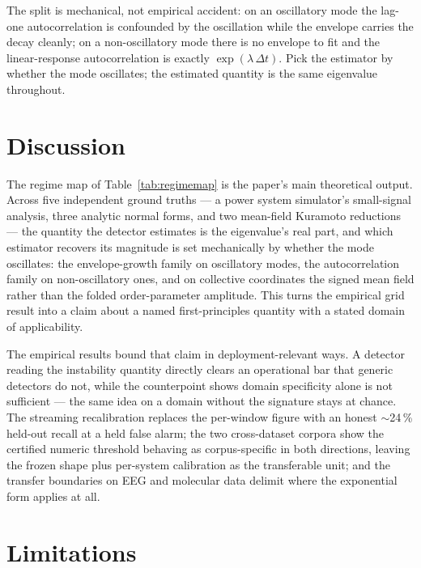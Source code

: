 \documentclass[11pt]{article}
\begin{document}
The split is mechanical, not empirical accident: on an oscillatory mode
the lag-one autocorrelation is confounded by the oscillation while the
envelope carries the decay cleanly; on a non-oscillatory mode there is
no envelope to fit and the linear-response autocorrelation is exactly
$\exp(\lambda\,\Delta t)$. Pick the estimator by whether the mode
oscillates; the estimated quantity is the same eigenvalue throughout.

\section{Discussion}\label{sec:discussion}

The regime map of Table~\ref{tab:regimemap} is the paper's main
theoretical output. Across five independent ground truths --- a power
system simulator's small-signal analysis, three analytic normal forms,
and two mean-field Kuramoto reductions --- the quantity the detector
estimates is the eigenvalue's real part, and which estimator recovers
its magnitude is set mechanically by whether the mode oscillates: the
envelope-growth family on oscillatory modes, the autocorrelation family
on non-oscillatory ones, and on collective coordinates the signed mean
field rather than the folded order-parameter amplitude. This turns the
empirical grid result into a claim about a named first-principles
quantity with a stated domain of applicability.

The empirical results bound that claim in deployment-relevant ways. A
detector reading the instability quantity directly clears an
operational bar that generic detectors do not, while the counterpoint
shows domain specificity alone is not sufficient --- the same idea on a
domain without the signature stays at chance. The streaming
recalibration replaces the per-window figure with an honest
$\sim$24\,\% held-out recall at a held false alarm; the two
cross-dataset corpora show the certified numeric threshold behaving as
corpus-specific in both directions, leaving the frozen shape plus
per-system calibration as the transferable unit; and the transfer
boundaries on EEG and molecular data delimit where the exponential
form applies at all.

\section{Limitations}\label{sec:limitations}
\end{document}
